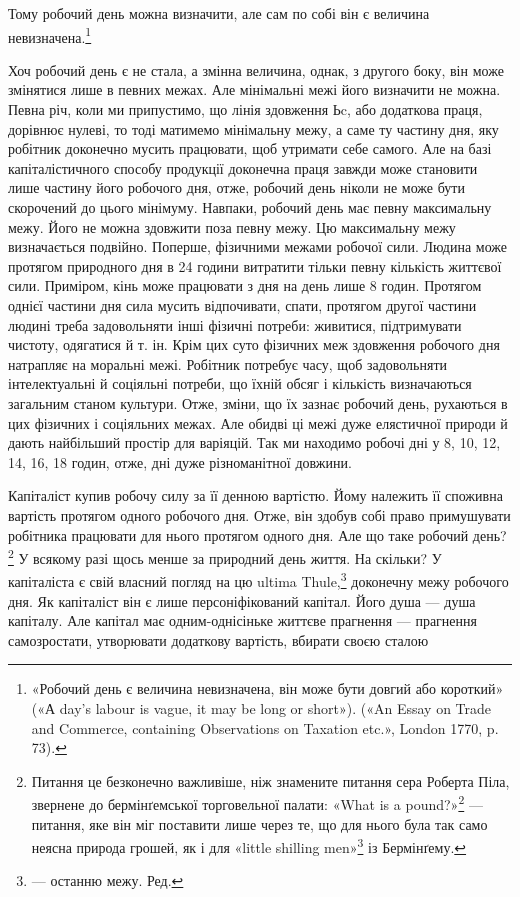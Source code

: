 \parcont{}  %
Тому робочий день можна визначити, але сам по собі він є величина
невизначена.\footnote{
«Робочий день є величина невизначена, він може бути довгий або
короткий» («А day’s labour is vague, it may be long or short»). («An
Essay on Trade and Commerce, containing Observations on Taxation etc.»,
London 1770, p. 73).
}

Хоч робочий день є не стала, а змінна величина, однак, з
другого боку, він може змінятися лише в певних межах. Але мінімальні
межі його визначити не можна. Певна річ, коли ми припустимо,
що лінія здовження Ьc, або додаткова праця, дорівнює
нулеві, то тоді матимемо мінімальну межу, а саме ту частину дня,
яку робітник доконечно мусить працювати, щоб утримати себе
самого. Але на базі капіталістичного способу продукції доконечна
праця завжди може становити лише частину його робочого дня,
отже, робочий день ніколи не може бути скорочений до цього
мінімуму. Навпаки, робочий день має певну максимальну межу.
Його не можна здовжити поза певну межу. Цю максимальну
межу визначається подвійно. Поперше, фізичними межами робочої
сили. Людина може протягом природного дня в 24 години
витратити тільки певну кількість життєвої сили. Приміром, кінь
може працювати з дня на день лише 8 годин. Протягом однієї
частини дня сила мусить відпочивати, спати, протягом другої
частини людині треба задовольняти інші фізичні потреби: живитися,
підтримувати чистоту, одягатися й т. ін. Крім цих суто
фізичних меж здовження робочого дня натрапляє на моральні
межі. Робітник потребує часу, щоб задовольняти інтелектуальні
й соціяльні потреби, що їхній обсяг і кількість визначаються
загальним станом культури. Отже, зміни, що їх зазнає робочий
день, рухаються в цих фізичних і соціяльних межах. Але обидві
ці межі дуже елястичної природи й дають найбільший простір
для варіяцій. Так ми находимо робочі дні у 8, 10, 12, 14, 16, 18
годин, отже, дні дуже різноманітної довжини.

Капіталіст купив робочу силу за її денною вартістю. Йому
належить її споживна вартість протягом одного робочого дня.
Отже, він здобув собі право примушувати робітника працювати
для нього протягом одного дня. Але що таке робочий день?\footnote{
Питання це безконечно важливіше, ніж знамените питання сера
Роберта Піла, звернене до бермінґемської торговельної палати: «What
is a pound?»\footnote*{
Що таке фунт стерлінґів? Ред.
} — питання, яке він міг поставити лише через те, що для
нього була так само неясна природа грошей, як і для «little shilling men»\footnote*{
— людців від шилінґів. Ред.
}
із Бермінґему.
}
У всякому разі щось менше за природний день життя. На
скільки? У капіталіста є свій власний погляд на цю ultima Thule,\footnote*{
— останню межу. Ред.
}
доконечну межу робочого дня. Як капіталіст він є лише персоніфікований
капітал. Його душа — душа капіталу. Але капітал
має одним-однісіньке життєве прагнення — прагнення самозростати,
утворювати додаткову вартість, вбирати своєю сталою
\parbreak{}  %
